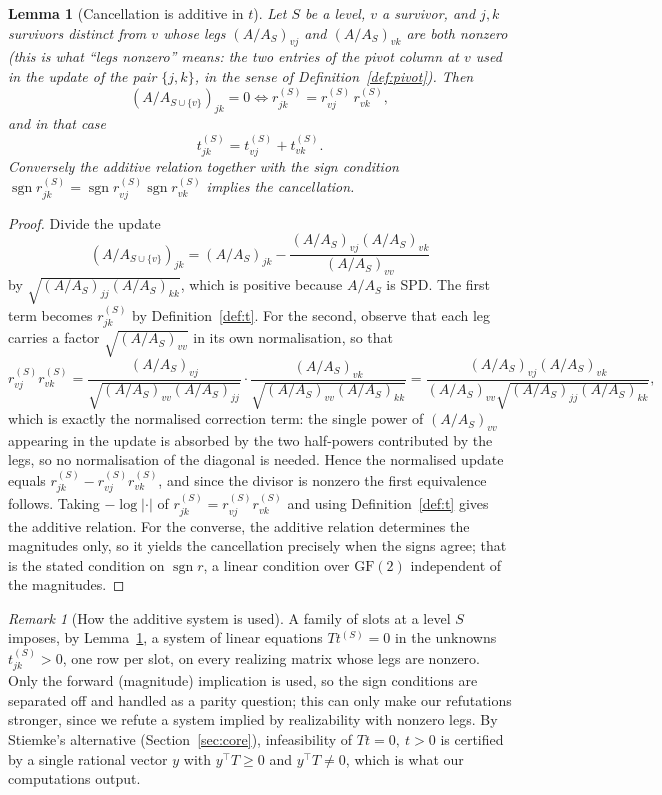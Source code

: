 \documentclass[11pt]{article}
\theoremstyle{plain}
\newtheorem{lemma}[theorem]{Lemma}
\theoremstyle{definition}
\theoremstyle{remark}
\newtheorem{remark}[theorem]{Remark}
\begin{document}
\begin{aiblock}
\begin{lemma}[Cancellation is additive in $t$]\label{lem:additive}
Let $S$ be a level, $v$ a survivor, and $j,k$ survivors distinct from $v$ whose \emph{legs}
$(A/A_S)_{vj}$ and $(A/A_S)_{vk}$ are both nonzero (this is what ``legs nonzero'' means: the two
entries of the pivot column at $v$ used in the update of the pair $\{j,k\}$, in the sense of
Definition~\ref{def:pivot}). Then
\[
(A/A_{S\cup\{v\}})_{jk}=0
\iff r^{(S)}_{jk}=r^{(S)}_{vj}\,r^{(S)}_{vk},
\]
and in that case
\[
t^{(S)}_{jk}=t^{(S)}_{vj}+t^{(S)}_{vk}.
\]
Conversely the additive relation together with the sign condition
$\operatorname{sgn}r^{(S)}_{jk}=\operatorname{sgn}r^{(S)}_{vj}\operatorname{sgn}r^{(S)}_{vk}$ implies
the cancellation.
\end{lemma}
\begin{proof}
Divide the update
\[
  (A/A_{S\cup\{v\}})_{jk}=(A/A_S)_{jk}-\frac{(A/A_S)_{vj}(A/A_S)_{vk}}{(A/A_S)_{vv}}
\]
by $\sqrt{(A/A_S)_{jj}(A/A_S)_{kk}}$, which is positive because $A/A_S$ is SPD. The first term becomes
$r^{(S)}_{jk}$ by Definition~\ref{def:t}. For the second, observe that each leg carries a factor
$\sqrt{(A/A_S)_{vv}}$ in its own normalisation, so that
\[
  r^{(S)}_{vj}r^{(S)}_{vk}
  =\frac{(A/A_S)_{vj}}{\sqrt{(A/A_S)_{vv}(A/A_S)_{jj}}}\cdot
   \frac{(A/A_S)_{vk}}{\sqrt{(A/A_S)_{vv}(A/A_S)_{kk}}}
  =\frac{(A/A_S)_{vj}(A/A_S)_{vk}}{(A/A_S)_{vv}\sqrt{(A/A_S)_{jj}(A/A_S)_{kk}}},
\]
which is exactly the normalised correction term: the single power of $(A/A_S)_{vv}$ appearing in the
update is absorbed by the two half-powers contributed by the legs, so no normalisation of the diagonal
is needed. Hence the normalised update equals $r^{(S)}_{jk}-r^{(S)}_{vj}r^{(S)}_{vk}$, and since the
divisor is nonzero the first equivalence follows. Taking $-\log|\cdot|$ of
$r^{(S)}_{jk}=r^{(S)}_{vj}r^{(S)}_{vk}$ and using Definition~\ref{def:t} gives the additive relation.
For the converse, the additive relation determines the magnitudes only, so it yields the cancellation
precisely when the signs agree; that is the stated condition on $\operatorname{sgn}r$, a linear
condition over $\mathrm{GF}(2)$ independent of the magnitudes.
\end{proof}

\begin{remark}[How the additive system is used]\label{rem:additive-use}
A family of slots at a level $S$ imposes, by Lemma~\ref{lem:additive}, a system of linear equations
$Tt^{(S)}=0$ in the unknowns $t^{(S)}_{jk}>0$, one row per slot, on every realizing matrix whose legs
are nonzero. Only the forward (magnitude)
implication is used, so the sign conditions are separated off and handled as a parity question; this
can only make our refutations stronger, since we refute a system implied by realizability with
nonzero legs. By
Stiemke's alternative (Section~\ref{sec:core}), infeasibility of $Tt=0,\ t>0$ is certified by a single
rational vector $y$ with $y^\top T\ge0$ and $y^\top T\neq0$, which is what our computations output.
\end{remark}


\end{aiblock}
\end{document}
